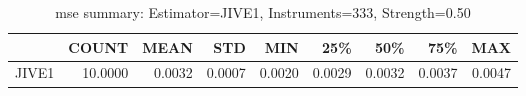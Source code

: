 \begin{table}[ht]
\centering
\caption{mse summary: Estimator=JIVE1, Instruments=333, Strength=0.50}
\begin{tabular}{lrrrrrrrr}
\toprule
 & COUNT & MEAN & STD & MIN & 25\% & 50\% & 75\% & MAX \\
\midrule
JIVE1 & 10.0000 & 0.0032 & 0.0007 & 0.0020 & 0.0029 & 0.0032 & 0.0037 & 0.0047 \\
\bottomrule
\end{tabular}
\end{table}
